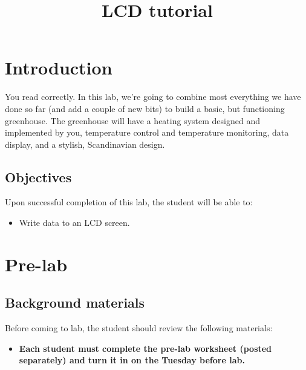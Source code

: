 \documentclass[11pt]{article} %
\title{LCD tutorial}
\author{}
\date{} %
\begin{document}
\maketitle


\section{Introduction}

You read correctly. In this lab, we're going to combine most everything we have done so far (and add a couple of new bits) to build a basic, but functioning greenhouse. The greenhouse will have a heating system designed and implemented by you, temperature control and temperature monitoring, data display, and a stylish, Scandinavian design.

\subsection{Objectives}

Upon successful completion of this lab, the student will be able to:
\begin{itemize}
\item Write data to an LCD screen.
\end{itemize}

\section{Pre-lab}
\subsection{Background materials}

Before coming to lab, the student should review the following materials:

\begin{itemize}
\item {\bf Each student must complete the pre-lab worksheet (posted separately) and turn it in on the Tuesday before lab.}
\end{itemize}
\end{document}
